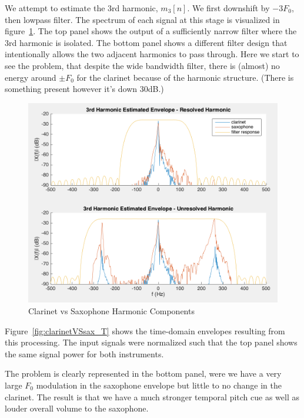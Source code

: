 \documentclass [11pt, proquest] {uwthesis}[2015/03/03]
\begin{document}
We attempt to estimate the 3rd harmonic, $m_3[n]$.  We first downshift by $-3F_0$, then lowpass filter.  The spectrum of each signal at this stage is visualized in figure~\ref{fig:clarinetVSsax_F}.  The top panel shows the output of a sufficiently narrow filter where the 3rd harmonic is isolated.  The bottom panel shows a different filter design that intentionally allows the two adjacent harmonics to pass through.  Here we start to see the problem, that despite the wide bandwidth filter, there is (almost) no energy around $\pm F_0$ for the clarinet because of the harmonic structure.  (There is something present however it's down 30dB.)

\begin{figure}[!ht]
  \centering
    \includegraphics[width=1\textwidth]{clarinetVSsax_F}
    \caption{Clarinet vs Saxophone Harmonic Components}\label{fig:clarinetVSsax_F}
\end{figure}

Figure~\ref{fig:clarinetVSsax_T} shows the time-domain envelopes resulting from this processing.  The input signals were normalized such that the top panel shows the same signal power for both instruments.

The problem is clearly represented in the bottom panel, were we have a very large $F_0$ modulation in the saxophone envelope but little to no change in the clarinet.  The result is that we have a much stronger temporal pitch cue as well as louder overall volume to the saxophone.
\end{document}

